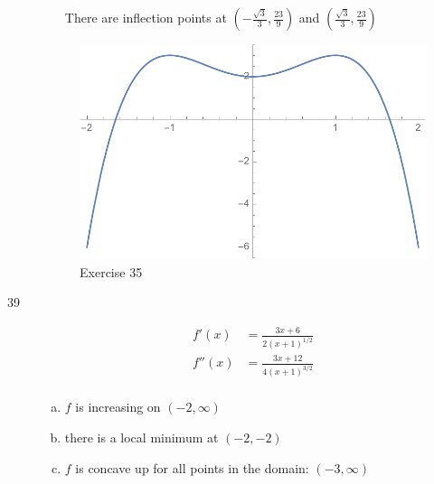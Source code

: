 \documentclass[letterpaper]{exam}
\begin{document}
\begin{description}
\begin{enumerate}[(a)]
          There are inflection points at $\left( -\frac{\sqrt{3}}{3}, \frac{23}{9} \right)$ and 
          $\left( \frac{\sqrt{3}}{3}, \frac{23}{9} \right)$

      \end{enumerate}

      \begin{figure}[H]
        \centering
        \includegraphics[scale = 0.6]{ex35.pdf}
        \caption{Exercise 35}
        \label{fig:ex35}
      \end{figure}

    \newpage

    \item[39]
      \begin{align*}
        f'(x)  & = \frac{3x + 6}{2 (x + 1)^{1/2}} \\
        f''(x) & = \frac{3x + 12}{4 (x + 1)^{3/2}} \\
      \end{align*}

      \begin{enumerate}[(a)]
        \item $f$ is increasing on $(-2, \infty)$

        \item there is a local minimum at $(-2, -2)$ 

        \item $f$ is concave up for all points in the domain: $(-3, \infty)$

      \end{enumerate}


\end{description}
\end{document}
